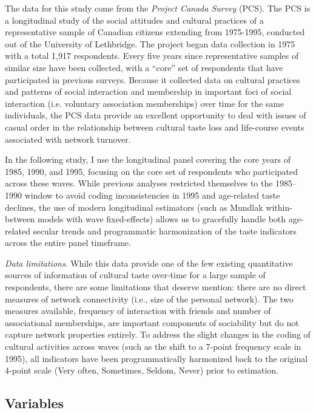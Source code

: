 \documentclass[
]{article}
\begin{document}
The data for this study come from the \emph{Project Canada Survey} (PCS). The PCS is a longitudinal study of the social attitudes and cultural practices of a representative sample of Canadian citizens extending from 1975-1995, conducted out of the University of Lethbridge. The project began data collection in 1975 with a total 1,917 respondents. Every five years since representative samples of similar size have been collected, with a ``core'' set of respondents that have participated in previous surveys. Because it collected data on cultural practices and patterns of social interaction and membership in important foci of social interaction (i.e. voluntary association memberships) over time for the same individuals, the PCS data provide an excellent opportunity to deal with issues of casual order in the relationship between cultural taste loss and life-course events associated with network turnover.

In the following study, I use the longitudinal panel covering the core years of 1985, 1990, and 1995, focusing on the core set of respondents who participated across these waves. While previous analyses restricted themselves to the 1985--1990 window to avoid coding inconsistencies in 1995 and age-related taste declines, the use of modern longitudinal estimators (such as Mundlak within-between models with wave fixed-effects) allows us to gracefully handle both age-related secular trends and programmatic harmonization of the taste indicators across the entire panel timeframe.

\emph{Data limitations}. While this data provide one of the few existing quantitative sources of information of cultural taste over-time for a large sample of respondents, there are some limitations that deserve mention: there are no direct measures of network connectivity (i.e., size of the personal network). The two measures available, frequency of interaction with friends and number of associational memberships, are important components of sociability but do not capture network properties entirely. To address the slight changes in the coding of cultural activities across waves (such as the shift to a 7-point frequency scale in 1995), all indicators have been programmatically harmonized back to the original 4-point scale (Very often, Sometimes, Seldom, Never) prior to estimation.

\subsection{Variables}\label{variables}
\end{document}
